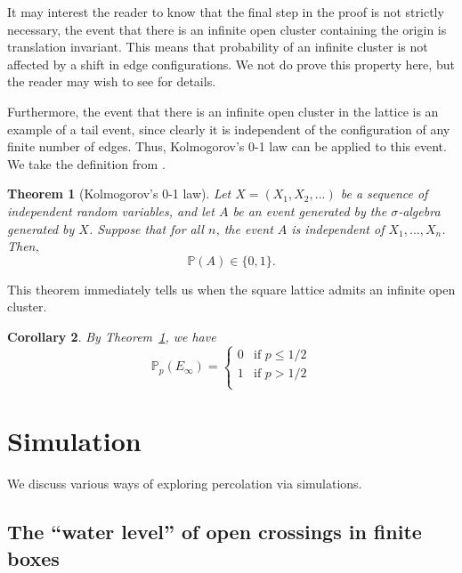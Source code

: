 \documentclass[a4paper,11pt]{article}
\newtheorem{theorem}{Theorem}[section]
\newtheorem{corollary}[theorem]{Corollary}
\theoremstyle{definition}
\newcommand{\sigalg}{$\sigma$-algebra }
\newcommand{\prob}{\mathbb{P}_p}
\begin{document}
It may interest the reader to know that the final step in the proof is not strictly necessary, the event that there is an infinite open cluster containing the origin is translation invariant. This means that probability of an infinite cluster is not affected by a shift in edge configurations. We not do prove this property here, but the reader may wish to see \cite{duminil2018introduction} for details. 

Furthermore, the event that there is an infinite open cluster in the lattice is an example of a tail event, since clearly it is independent of the configuration of any finite number of edges. Thus, Kolmogorov's 0-1 law can be applied to this event. We take the definition from \cite{bollo2006}.
\begin{theorem}[Kolmogorov's 0-1 law]\label{01Law}
	Let $X = (X_1,X_2,...)$ be a sequence of independent random variables, and let $A$ be an event generated by the \sigalg generated by $X$. Suppose that for all $n$, the event $A$ is independent of $X_1,...,X_n$. Then, $$\mathbb{P}(A) \in \{0,1\}.$$
\end{theorem}
This theorem immediately tells us when the square lattice admits an infinite open cluster. 

\begin{corollary}
	By Theorem~\ref*{01Law}, we have 
	$$\prob(E_{\infty}) = \begin{cases}
		0 & \text{if }p \leq 1/2\\
		1 & \text{if }p > 1/2\\
	\end{cases} $$
\end{corollary}


\section{Simulation}
We discuss various ways of exploring percolation via simulations.
\subsection{The ``water level'' of open crossings in finite boxes}
\end{document}
